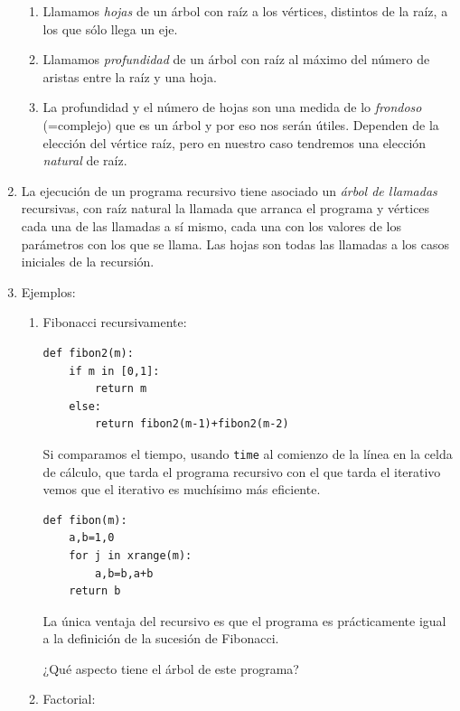 \begin{enumerate}
\begin{enumerate}
\item Llamamos {\itshape hojas} de un árbol con raíz a los vértices,
distintos de la raíz,  a los que sólo llega un eje.

\item Llamamos {\itshape profundidad} de un árbol con raíz al máximo
del número de aristas entre la raíz y una hoja. 

\item La profundidad y el número de hojas son una medida de lo {\itshape
frondoso} (=complejo) que es un árbol y por eso nos serán útiles. Dependen
de la elección del vértice raíz, pero en nuestro caso tendremos una
elección {\itshape natural} de raíz.

\end{enumerate}

\item La ejecución de un  programa recursivo tiene asociado un {\itshape
árbol de llamadas} recursivas,  con raíz natural  la llamada que arranca
el programa y vértices cada una de las llamadas a sí mismo, cada una con
los valores de los parámetros con los que se llama. Las hojas son todas las
llamadas a los casos iniciales de la recursión. 

\pagebreak[3]

\item {\sc Ejemplos:}

\begin{enumerate}
\item {\sc Fibonacci recursivamente:}

\begin{lstlisting}[columns=spaceflexible]
def fibon2(m):
	if m in [0,1]:
		return m
	else:
		return fibon2(m-1)+fibon2(m-2) 
\end{lstlisting}
\label{fibor}
Si comparamos el tiempo, usando  \verb=time= al comienzo de la línea en la
celda
de cálculo, que tarda el programa recursivo con el que
tarda el iterativo vemos que el iterativo es muchísimo más eficiente. 


\begin{lstlisting}[columns=spaceflexible]
def fibon(m):
	a,b=1,0
	for j in xrange(m):
		a,b=b,a+b
	return b
\end{lstlisting}

La única ventaja del recursivo es que el programa es
prácticamente igual a la definición de la sucesión de Fibonacci.

¿Qué aspecto tiene el árbol de este programa?

\item {\sc Factorial:}


\end{enumerate}
\end{enumerate}

